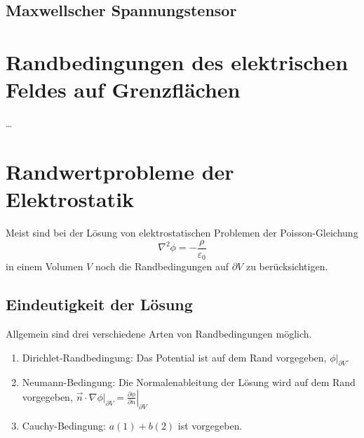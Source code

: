 \subsection{Maxwellscher Spannungstensor}

\section{Randbedingungen des elektrischen Feldes auf Grenzflächen}

 {\ldots}

\section{Randwertprobleme der Elektrostatik}

Meist sind bei der Lösung von elektrostatischen Problemen der Poisson-Gleichung
\begin{equation*}
	\nabla ^{2}\phi =-\frac{\rho }{\varepsilon _{0}}
\end{equation*}
in einem Volumen $V$ noch die Randbedingungen auf $\partial V$ zu berücksichtigen.

\subsection{Eindeutigkeit der Lösung}

Allgemein sind drei verschiedene Arten von Randbedingungen möglich. 

\begin{enumerate}
	\item Dirichlet-Randbedingung: Das Potential ist auf dem Rand vorgegeben, $\left.\hspace{0pt}\phi \right| _{\partial V}$.

	\item Neumann-Bedingung: Die Normalenableitung der Lösung wird auf dem Rand vorgegeben, $\vec {n}\cdot \left.\hspace{0pt}\nabla \phi \right| _{\partial V}=\left.\frac{\partial \phi }{\partial n}\right| _{\partial V}$

	\item Cauchy-Bedingung: $a\left(1\right)+b\left(2\right)$ ist vorgegeben.
\end{enumerate}

